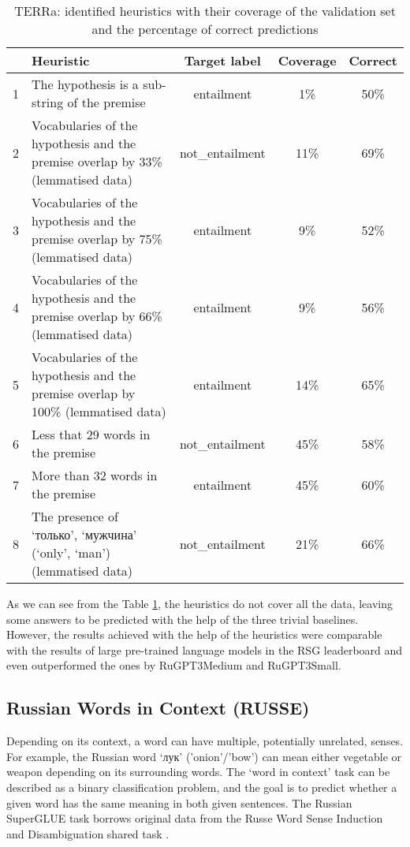 \documentclass[11pt]{article}
\begin{document}
\begin{table}[ht]
\centering
\begin{tabular}{|c|p{}|c|c|c|}
\hline
&\textbf{Heuristic} & \textbf{Target label} & \textbf{Coverage} & \textbf{Correct} \\
\hline
1 & The hypothesis is a sub-string of the premise & entailment & 1\% & 50\% \\
\hline
2 & Vocabularies of the hypothesis and the premise overlap by 33\%  (lemmatised data)& not\_entailment & 11\% & 69\% \\
\hline
3 & Vocabularies of the hypothesis and the premise overlap by 75\% (lemmatised data)& entailment & 9\% & 52\% \\
\hline
4 & Vocabularies of the hypothesis and the premise overlap by 66\% (lemmatised data)& entailment & 9\% & 56\% \\
\hline
5 & Vocabularies of the hypothesis and the premise overlap by 100\% (lemmatised data)& entailment & 14\% & 65\% \\
\hline
6 & Less that 29 words in the premise & not\_entailment & 45\% & 58\%\\
\hline
7 & More than 32 words in the premise & entailment & 45\% & 60\%\\
\hline
8 & The presence of \foreignlanguage{russian}{`только', `мужчина'} (`only', `man') (lemmatised data)& not\_entailment & 21\% & 66\%\\
\hline     
\end{tabular}
\caption{TERRa: identified heuristics with their coverage of the validation set and the percentage of correct predictions}
\label{table:TERRa_heuristics}
\end{table}

As we can see from the Table \ref{table:TERRa_heuristics}, the heuristics do not cover all the data, leaving some answers to be predicted with the help of the three trivial baselines. However, the results achieved with the help of the heuristics were comparable with the results of large pre-trained language models in the RSG leaderboard and even outperformed the ones by RuGPT3Medium and RuGPT3Small. 

\subsection{Russian Words in Context (RUSSE)}

Depending on its context, a word can have multiple, potentially unrelated, senses. For example, the Russian word \foreignlanguage{russian}{`лук'} ('onion'/'bow') can mean either vegetable or weapon depending on its surrounding words. The `word in context' task can be described as a binary classification problem, and the goal is to predict whether a given word has the same meaning in both given sentences.
The Russian SuperGLUE task borrows original data from the Russe Word Sense Induction and Disambiguation shared task \cite{Panchenko:18}. 
\end{document}
